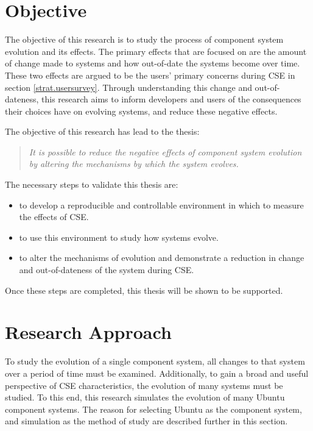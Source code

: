 \section{Objective}
The objective of this research is to study the process of component system evolution and its effects.
The primary effects that are focused on are the amount of change made to systems and how out-of-date the systems become over time.
These two effects are argued to be the users' primary concerns during CSE in section \ref{strat.usersurvey}.
Through understanding this change and out-of-dateness,
this research aims to inform developers and users of the consequences their choices have on evolving systems,
and reduce these negative effects.

The objective of this research has lead to the thesis:
\begin{quote}
\textit{It is possible to reduce the negative effects of component system evolution by altering the mechanisms by which the system evolves.} 
\end{quote}

The necessary steps to validate this thesis are:
\begin{itemize}
  \item to develop a reproducible and controllable environment in which to measure the effects of CSE.
  \item to use this environment to study how systems evolve.
  \item to alter the mechanisms of evolution and demonstrate a reduction in change and out-of-dateness of the system during CSE.
\end{itemize}

Once these steps are completed, this thesis will be shown to be supported.  

\section{Research Approach}
To study the evolution of a single component system, all changes to that system over a period of time must be examined.
Additionally, to gain a broad and useful perspective of CSE characteristics, the evolution of many systems must be studied.
To this end, this research simulates the evolution of many Ubuntu component systems.
The reason for selecting Ubuntu as the component system, and simulation as the method of study are described further in this section.

